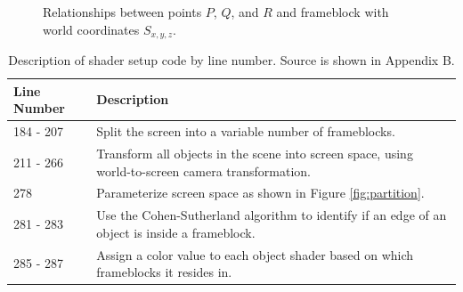 \documentclass[conference]{IEEEtran}
\begin{document}
\begin{adjustwidth}{2.5em}{0pt}
\begin{figure}[h!]
\begin{center}
\end{center}
\caption{Relationships between points $P$, $Q$, and $R$ and frameblock with world coordinates $S_{x,y,z}$.}
\label{fig:distances}
\end{figure}
\end{adjustwidth}

\begin{table}[t]
\begin{centering}
\bgroup
\def\arraystretch{1.5}
\begin{tabular}{| m{} | m{} |} 
\hline
Line Number & Description \\ 
\hline
\hline
184 - 207 & Split the screen into a variable number of frameblocks. \\
211 - 266 & Transform all objects in the scene into screen space, using world-to-screen camera transformation. \\
278       & Parameterize screen space as shown in Figure \ref{fig:partition}. \\
281 - 283 & Use the Cohen-Sutherland algorithm to identify if an edge of an object is inside a frameblock. \\
285 - 287 & Assign a color value to each object shader based on which frameblocks it resides in. \\
\hline
\end{tabular}
\caption{Description of shader setup code by line number.
Source is shown in Appendix B.}
\label{tbl:app_a}
\egroup
\end{centering}
\end{table}
\end{document}
